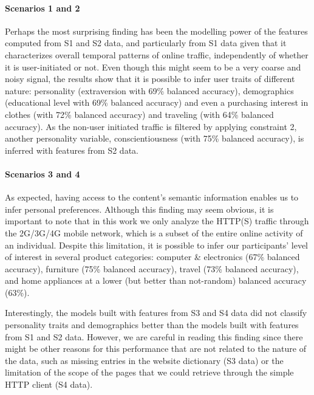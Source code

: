 \paragraph{Scenarios 1 and 2} Perhaps the most surprising finding has been the modelling power of the features computed from S1 and S2 data, and particularly from S1 data given that it characterizes overall temporal patterns of online traffic, independently of whether it is user-initiated or not. Even though this might seem to be a very coarse and noisy signal, the results show that it is possible to infer user traits of different nature: personality (extraversion with 69\% balanced accuracy), demographics (educational level with 69\% balanced accuracy) and even a purchasing interest in clothes (with 72\% balanced accuracy) and traveling (with 64\% balanced accuracy). As the non-user initiated traffic is filtered by applying constraint 2, another personality variable, conscientiousness (with 75\% balanced accuracy), is inferred with features from S2 data. 

\paragraph{Scenarios 3 and 4} As expected, having access to the content's semantic information enables us to infer personal preferences. Although this finding may seem obvious, it is important to note that in this work we only analyze the HTTP(S) traffic through the 2G/3G/4G mobile network, which is a subset of the entire online activity of an individual. Despite this limitation, it is possible to infer our participants' level of interest in several product categories: computer \& electronics (67\% balanced accuracy), furniture (75\% balanced accuracy), travel (73\% balanced accuracy), and home appliances at a lower (but better than not-random) balanced accuracy (63\%).

Interestingly, the models built with features from S3 and S4 data did not classify personality traits and demographics better than the models built with features from S1 and S2 data. However, we are careful in reading this finding since there might be other reasons for this performance that are not related to the nature of the data, such as missing entries in the website dictionary (S3 data) or the limitation of the scope of the pages that we could retrieve through the simple HTTP client (S4 data).

